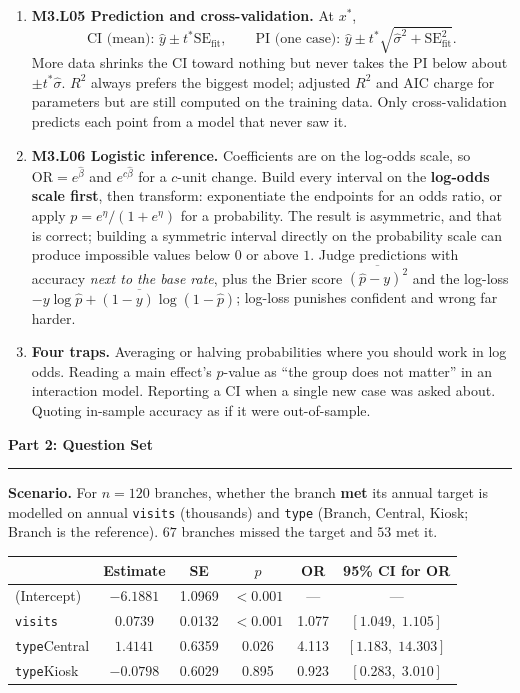 \documentclass[11pt]{article}
\newcommand{\parttitle}[1]{%
  \par\medskip\noindent
  {\large\bfseries #1}\par
  \vspace{-.5em}\noindent\rule{\linewidth}{0.4pt}\par\smallskip}
\begin{document}
{\begin{enumerate}[label=\textbf{\arabic*.}, wide=0pt, itemsep=.4em, topsep=.5em]
\item \textbf{M3.L05 Prediction and cross-validation.} At $x^{\ast}$,
\[
\text{CI (mean): } \hat{y} \pm t^{\ast}\text{SE}_{\text{fit}},
\qquad
\text{PI (one case): } \hat{y} \pm t^{\ast}\sqrt{\hat\sigma^2 + \text{SE}_{\text{fit}}^2}.
\]
More data shrinks the CI toward nothing but never takes the PI below about
$\pm t^{\ast}\hat\sigma$. $R^2$ always prefers the biggest model; adjusted $R^2$ and AIC charge for
parameters but are still computed on the training data. Only cross-validation predicts each point
from a model that never saw it.

\item \textbf{M3.L06 Logistic inference.} Coefficients are on the log-odds scale, so
$\text{OR} = e^{\hat\beta}$ and $e^{c\hat\beta}$ for a $c$-unit change. Build every interval on the
\textbf{log-odds scale first}, then transform: exponentiate the endpoints for an odds ratio, or apply
$p = e^{\eta}/(1+e^{\eta})$ for a probability. The result is asymmetric, and that is correct;
building a symmetric interval directly on the probability scale can produce impossible values below
$0$ or above $1$. Judge predictions with accuracy \emph{next to the base rate}, plus the Brier score
$\overline{(\hat{p}-y)^2}$ and the log-loss
$-\overline{y\log\hat{p} + (1-y)\log(1-\hat{p})}$; log-loss punishes confident and wrong far harder.

\item \textbf{Four traps.} Averaging or halving probabilities where you should work in log odds.
Reading a main effect's $p$-value as ``the group does not matter'' in an interaction model. Reporting
a CI when a single new case was asked about. Quoting in-sample accuracy as if it were out-of-sample.

\end{enumerate}

}

\newpage

\parttitle{Part 2: Question Set}

\noindent\textbf{Scenario.} For $n = 120$ branches, whether the branch \textbf{met} its annual
target is modelled on annual \texttt{visits} (thousands) and \texttt{type} (Branch, Central, Kiosk;
Branch is the reference). $67$ branches missed the target and $53$ met it.

\begin{center}
\renewcommand{\arraystretch}{1.2}
\begin{tabular}{lccccc}
\toprule
 & \textbf{Estimate} & \textbf{SE} & \textbf{$p$} & \textbf{OR} & \textbf{95\% CI for OR} \\
\midrule
(Intercept) & $-6.1881$ & 1.0969 & $<0.001$ & --- & --- \\
\texttt{visits} & $0.0739$ & 0.0132 & $<0.001$ & 1.077 & $[1.049,\; 1.105]$ \\
\texttt{type}Central & $1.4141$ & 0.6359 & 0.026 & 4.113 & $[1.183,\; 14.303]$ \\
\texttt{type}Kiosk & $-0.0798$ & 0.6029 & 0.895 & 0.923 & $[0.283,\; 3.010]$ \\
\bottomrule
\end{tabular}
\end{center}
\end{document}
